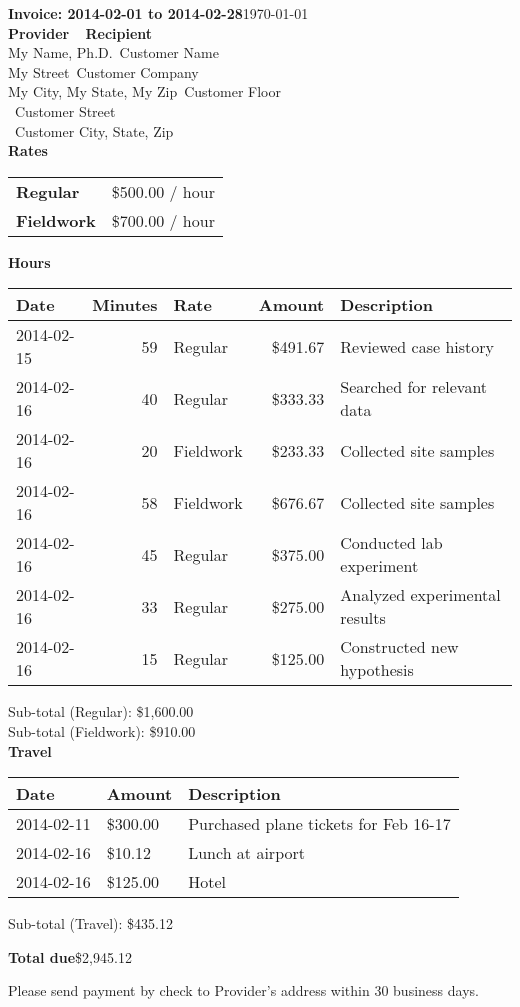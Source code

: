 \documentclass{article}
\begin{document}
{\Large \textbf{Invoice: 2014-02-01 to 2014-02-28}}\hfill \today\\

\textbf{Provider} \mbox{}~\hfill{} \textbf{Recipient} \\
My Name, Ph.D.\mbox{}~\hfill Customer Name \\
My Street\mbox{}~\hfill Customer Company \\
My City, My State, My Zip\mbox{}~\hfill Customer Floor \\
\mbox{}~\hfill Customer Street \\
\mbox{}~\hfill Customer City, State, Zip \\

{\Large\textbf{Rates}}


\begin{tabular}{ll}
\textbf{Regular} & \$500.00 / hour \\
\textbf{Fieldwork} & \$700.00 / hour \\
\end{tabular}

{\Large\textbf{Hours}}


\begin{tabular}{|l|r|l|r|l|}
\hline
\textbf{Date}&\textbf{Minutes}&\textbf{Rate}&\textbf{Amount}&\textbf{Description} \\ \hline
\hline
2014-02-15 & 59 & Regular & \$491.67 & Reviewed case history\\
\hline
2014-02-16 & 40 & Regular & \$333.33 & Searched for relevant data\\
\hline
2014-02-16 & 20 & Fieldwork & \$233.33 & Collected site samples\\
\hline
2014-02-16 & 58 & Fieldwork & \$676.67 & Collected site samples\\
\hline
2014-02-16 & 45 & Regular & \$375.00 & Conducted lab experiment\\
\hline
2014-02-16 & 33 & Regular & \$275.00 & Analyzed experimental results\\
\hline
2014-02-16 & 15 & Regular & \$125.00 & Constructed new hypothesis\\
\hline
\end{tabular}


Sub-total (Regular): \$1,600.00 \\Sub-total (Fieldwork): \$910.00 \\


{\Large\textbf{Travel}}


\begin{tabular}{|l|l|l|}
\hline
\textbf{Date}&\textbf{Amount}&\textbf{Description}\\ \hline
\hline 2014-02-11 & \$300.00 & Purchased plane tickets for Feb 16-17 \\
\hline 2014-02-16 & \$10.12 & Lunch at airport \\
\hline 2014-02-16 & \$125.00 & Hotel \\
\hline
\end{tabular}


Sub-total (Travel): \$435.12

\vfill
{\Large\textbf{Total due}\hfill\$2,945.12}

Please send payment by check to Provider's address within 30 business days.
\end{document}

